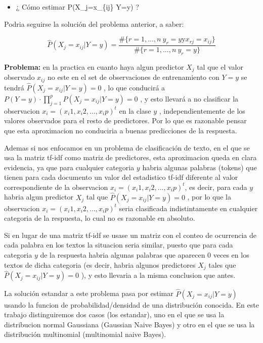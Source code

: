 \documentclass[
  11pt,
  a4paper,
]{article}
\providecommand{\tightlist}{%
  \setlength{\itemsep}{0pt}\setlength{\parskip}{0pt}}
\begin{document}
\begin{itemize}
\tightlist
\item
  ¿ Cómo estimar P(X\_j=x\_\{ij\} \textbar{} Y=y) ?
\end{itemize}

Podria seguirse la solución del problema anterior, a saber:

\[\widehat{P}(X_j=x_{ij} | Y=y) = \dfrac{ \# \lbrace r=1,...,n \  y_r = y  \text{y} x_{rj} = x_{ij} \rbrace }{ \# \lbrace  r=1,...,n \  y_r = y  \rbrace}\]

\textbf{Problema:} en la practica en cuanto haya algun predictor \(X_j\)
tal que el valor observado \(x_{ij}\) no este en el set de observaciones
de entrenamiento con \(Y=y\) se tendrá
\(\widehat{P}(X_j=x_{ij} | Y=y) = 0\) , lo que conducirá a
\(P(Y=y) \cdot\prod_{j=1}^{p} P(X_j=x_{ij} | Y=y) = 0\) , y esto llevará
a no clasificar la observacion \(x_i = (x_i1 , x_i2, ..., x_ip)^t\) en
la clase \(y\) , independientemente de los valores observados para el
resto de predictores. Por lo que es razonable pensar que esta
aproximacion no conduciria a buenas predicciones de la respuesta.

Ademas si nos enfocamos en un problema de clasificación de texto, en el
que se usa la matriz tf-idf como matriz de predictores, esta
aproximacion queda en clara evidencia, ya que para cualquier categoria
\(y\) habria algunas palabras (tokens) que tienen para cada documento un
valor del estadistico tf-idf diferente al valor correspondiente de la
observacion \(x_i = (x_i1 , x_i2, ..., x_ip)^t\), es decir, para cada
\(y\) habria algun predictor \(X_j\) tal que
\(\widehat{P}(X_j=x_{ij} | Y=y) = 0\) , por lo que la observacion
\(x_i = (x_i1 , x_i2, ..., x_ip)^t\) seria clasificada indistintamente
en cualquier categoria de la respuesta, lo cual no es razonable en
absoluto.

Si en lugar de una matriz tf-idf se usase un matriz con el conteo de
ocurrencia de cada palabra en los textos la situacion seria similar,
puesto que para cada categoria \(y\) de la respuesta habria algunas
palabras que aparecen 0 veces en los textos de dicha categoria (es
decir, habria algunos predictores \(X_j\) tales que
\(\widehat{P}(X_j=x_{ij} | Y=y) = 0\) ), y esto llevaria a la misma
conclusion que antes.

La solución estandar a este problema pasa por estimar
\(\widehat{P}(X_j=x_{ij} | Y=y)\) usando la funcion de
probabilidad/densidad de una distribución conocida. En este trabajo
distinguiremos dos casos (los estandar), uno en el que se usa la
distribucion normal Gaussiana (Gaussian Naive Bayes) y otro en el que se
usa la distribución multinomial (multinomial naive Bayes).
\end{document}
